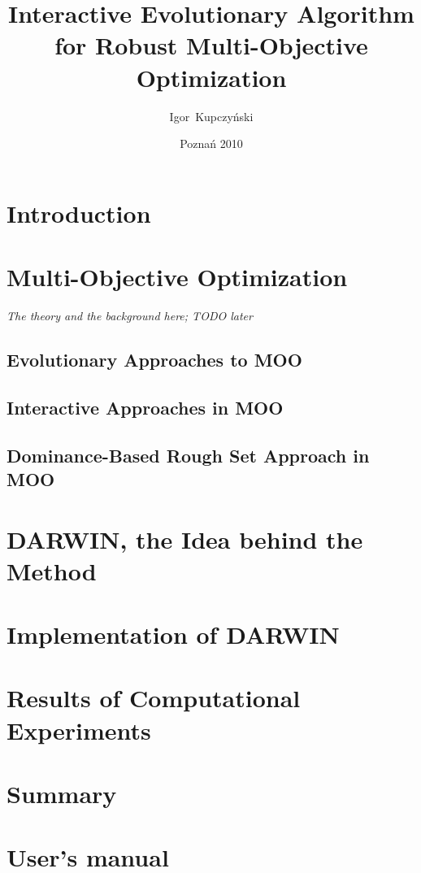 \documentclass[a4paper,english,thesis]{dcsbook}
\author{Igor~Kupczy\'nski}
\date{Pozna\'n 2010}
\title{Interactive Evolutionary Algorithm \\ for Robust Multi-Objective
  Optimization}
\begin{document}
\maketitle
\frontmatter
\tableofcontents{}
\mainmatter

\chapter{Introduction}

\chapter{Multi-Objective Optimization}
\textit{The theory and the background here; TODO later}
\section{Evolutionary Approaches to MOO}
\label{sec_ea_in_moo}
\section{Interactive Approaches in MOO}
\label{sec_ia_in_moo}
\section{Dominance-Based Rough Set Approach in MOO}
\label{sec_drsa_in_moo}

\chapter{DARWIN, the Idea behind the Method}
\label{darwin-the-idea}

\chapter{Implementation of DARWIN}
\label{darwin-implementation}


\chapter{Results of Computational Experiments}
\label{exp-results}


\chapter{Summary}


\backmatter



\appendix
\appendixpage
\addappheadtotoc
\chapter{User's manual}

\end{document}
